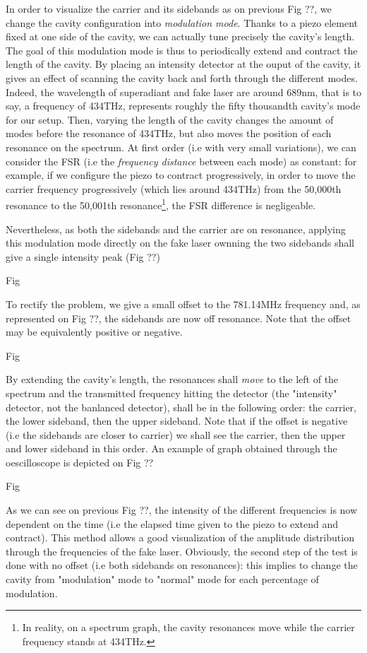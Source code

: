 \documentclass[12pt]{report}
\begin{document}
In order to visualize the carrier and its sidebands as on previous Fig ??, we change the cavity configuration into \textit{modulation mode}. Thanks to a piezo element fixed at one side of the cavity, we can actually tune precisely the cavity's length. The goal of this modulation mode is thus to periodically extend and contract the length of the cavity. By placing an intensity detector at the ouput of the cavity, it gives an effect of scanning the cavity back and forth through the different modes. Indeed, the wavelength of superadiant and fake laser are around 689nm, that is to say, a frequency of 434THz, represents roughly the fifty thousandth cavity's mode for our setup. Then, varying the length of the cavity changes the amount of modes before the resonance of 434THz, but also moves the position of each resonance on the spectrum. At first order (i.e with very small variations), we can consider the FSR (i.e the \textit{frequency distance} between each mode) as constant: for example, if we configure the piezo to contract progressively, in order to move the carrier frequency progressively (which lies around 434THz) from the 50,000th resonance to the 50,001th resonance\footnote{In reality, on a spectrum graph, the cavity resonances move while the carrier frequency stands at 434THz.}, the FSR difference is negligeable.

Nevertheless, as both the sidebands and the carrier are on resonance, applying this modulation mode directly on the fake laser ownning the two sidebands shall give a single intensity peak (Fig ??)

Fig

To rectify the problem, we give a small offset to the 781.14MHz frequency and, as represented on Fig ??, the sidebands are now off resonance. Note that the offset may be equivalently positive or negative.

Fig

By extending the cavity's length, the resonances shall \textit{move} to the left of the spectrum and the transmitted frequency hitting the detector (the "intensity" detector, not the banlanced detector), shall be in the following order: the carrier, the lower sideband, then the upper sideband. Note that if the offset is negative (i.e the sidebands are closer to carrier) we shall see the carrier, then the upper and lower sideband in this order. An example of graph obtained through the oescilloscope is depicted on Fig ??

Fig

As we can see on previous Fig ??, the intensity of the different frequencies is now dependent on the time (i.e the elapsed time given to the piezo to extend and contract). This method allows a good visualization of the amplitude distribution through the frequencies of the fake laser. Obviously, the second step of the test is done with no offset (i.e both sidebands on resonances): this implies to change the cavity from "modulation" mode to "normal" mode for each percentage of modulation.
\end{document}
